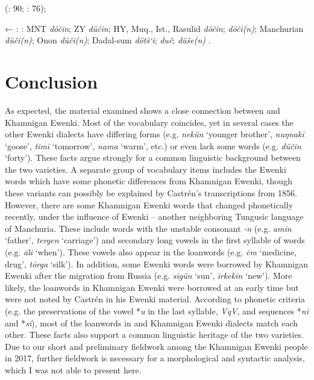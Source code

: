 \documentclass[output=paper,colorlinks,citecolor=brown]{langscibook}
\begin{document}
    (\citealt{Castrén1856}: 90; \citealt{Janhunen1991}: 76);

    ← : : MNT \textit{döčin}; ZY \textit{düčin}; HY, Muq., Ist., Rasulid \textit{döčin};  \textit{döči(n)}; Manchurian  \textit{düči(n)}; Onon  \textit{düči(n)}; Dadal-sum  \textit{dötš`i};  \textit{duč};  \textit{düše(n)} \citep[81]{Khabtagaeva2017}.
\z
\z


\section{Conclusion}
\begin{sloppypar}
As expected, the material examined shows a close connection between  and Khamnigan Ewenki. Most of the vocabulary coincides, yet in several cases the other Ewenki dialects have differing forms (e.g. \textit{nekün} ‘younger brother’, \textit{nuŋnakī} ‘goose’, \textit{timī} ‘tomorrow’, \textit{nama} ‘warm’, etc.) or even lack some words (e.g. \textit{düčin} ‘forty’). These facts argue strongly for a common linguistic background between the two varieties. A separate group of vocabulary items includes the  Ewenki words which have some phonetic differences from Khamnigan Ewenki, though these variants can possibly be explained by Castrén’s transcriptions from 1856. However, there are some Khamnigan Ewenki words that changed phonetically recently, under the influence of  Ewenki – another neighboring Tungusic language of Manchuria. These include words with the unstable consonant \textit{-n} (e.g. \textit{amin} ‘father’, \textit{tergen} ‘carriage’) and secondary long vowels in the first syllable of words (e.g. \textit{āli} ‘when’). These vowels also appear in the  loanwords (e.g. \textit{ēm} ‘medicine, drug’, \textit{tōrga} ‘silk’). In addition, some  Ewenki words were borrowed by Khamnigan Ewenki after the migration from Russia (e.g. \textit{sigün} ‘sun’, \textit{irkekīn} ‘new’). More likely, the  loanwords in Khamnigan Ewenki were borrowed at an early time but were not noted by Castrén in his  Ewenki material. According to phonetic criteria (e.g. the preservations of the vowel *\textit{u} in the last syllable,  \textit{VqV}, and sequences *\textit{ni} and *\textit{si}), most of the  loanwords in  and Khamnigan Ewenki dialects match each other. These facts also support a common linguistic heritage of the two varieties. Due to our short and preliminary fieldwork among the Khamnigan Ewenki people in 2017, further fieldwork is necessary for a morphological and syntactic analysis, which I was not able to present here.
\end{sloppypar}
\end{document}
